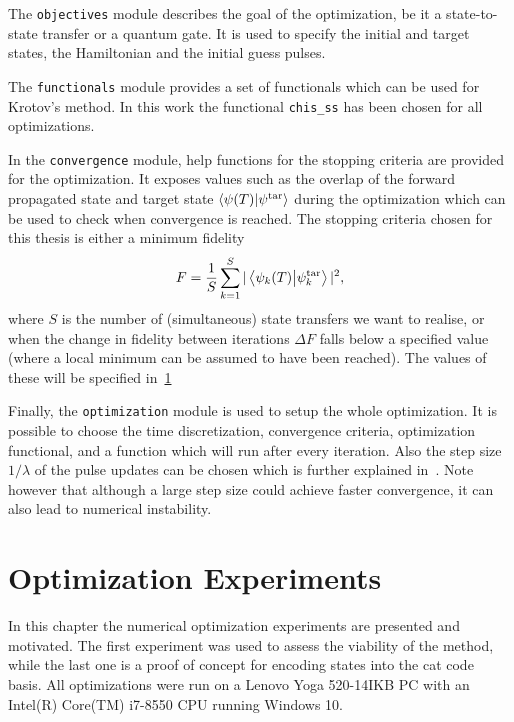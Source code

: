 \documentclass[main.tex]{subfiles}
\begin{document}
The \texttt{objectives} module describes the goal of the optimization, be it a state-to-state transfer or a quantum gate.
It is used to specify the initial and target states, the Hamiltonian and the initial guess pulses.

The \texttt{functionals} module provides a set of functionals which can be used for Krotov's method.
In this work the functional \texttt{chis\_ss} has been chosen for all optimizations.

In the \texttt{convergence} module, help functions for the stopping criteria are provided for the optimization.
It exposes values such as the overlap of the forward propagated state and target state \(\braket{\psi(T)}{\psi^{\text{tar}}}\) during the optimization which can be used to check when convergence is reached.
The stopping criteria chosen for this thesis is either a minimum fidelity
\begin{equation}
    F = \frac{1}{S}\sum_{k=1}^{S} |\braket{\psi_k(T)}{\psi_{k}^{\text{tar}}}|^2,
    \label{eq:total-fidelity}
\end{equation}
where \(S\) is the number of (simultaneous) state transfers we want to realise, or when the change in fidelity between iterations \(\Delta F\) falls below a specified value (where a local minimum can be assumed to have been reached).
The values of these will be specified in~\cref{sec:optimization-experiments}

Finally, the \texttt{optimization} module is used to setup the whole optimization.
It is possible to choose the time discretization, convergence criteria, optimization functional, and a function which will run after every iteration.
Also the step size \(1/\lambda\) of the pulse updates can be chosen which is further explained in~\cite{goerz_krotov:_2019}.
Note however that although a large step size could achieve faster convergence, it can also lead to numerical instability.

\section{Optimization Experiments}
\label{sec:optimization-experiments}
In this chapter the numerical optimization experiments are presented and motivated.
The first experiment was used to assess the viability of the method, while the last one is a proof of concept for encoding states into the cat code basis.
All optimizations were run on a Lenovo Yoga 520-14IKB PC with an Intel(R) Core(TM) i7-8550 CPU running Windows 10.
\end{document}
